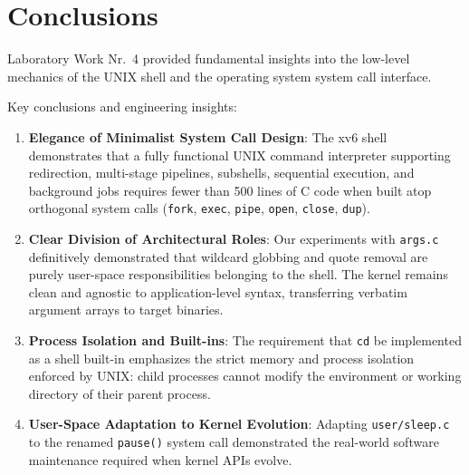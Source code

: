 \documentclass[12pt,a4paper]{article}
\begin{document}
\section{Conclusions}
Laboratory Work Nr.~4 provided fundamental insights into the low-level mechanics of the UNIX shell and the operating system system call interface.

Key conclusions and engineering insights:
\begin{enumerate}
    \item \textbf{Elegance of Minimalist System Call Design}: The xv6 shell demonstrates that a fully functional UNIX command interpreter supporting redirection, multi-stage pipelines, subshells, sequential execution, and background jobs requires fewer than 500 lines of C code when built atop orthogonal system calls (\texttt{fork}, \texttt{exec}, \texttt{pipe}, \texttt{open}, \texttt{close}, \texttt{dup}).
    \item \textbf{Clear Division of Architectural Roles}: Our experiments with \texttt{args.c} definitively demonstrated that wildcard globbing and quote removal are purely user-space responsibilities belonging to the shell. The kernel remains clean and agnostic to application-level syntax, transferring verbatim argument arrays to target binaries.
    \item \textbf{Process Isolation and Built-ins}: The requirement that \texttt{cd} be implemented as a shell built-in emphasizes the strict memory and process isolation enforced by UNIX: child processes cannot modify the environment or working directory of their parent process.
    \item \textbf{User-Space Adaptation to Kernel Evolution}: Adapting \texttt{user/sleep.c} to the renamed \texttt{pause()} system call demonstrated the real-world software maintenance required when kernel APIs evolve.
\end{enumerate}
\end{document}
